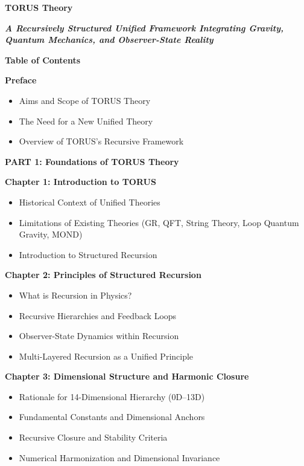 \documentclass[
]{article}
\author{}
\date{}
\begin{document}
\textbf{TORUS Theory\\
}

\emph{\textbf{A Recursively Structured Unified Framework Integrating
Gravity, Quantum Mechanics, and Observer-State Reality}}


\textbf{Table of Contents}

\textbf{Preface}

\begin{itemize}
\item
  Aims and Scope of TORUS Theory
\item
  The Need for a New Unified Theory
\item
  Overview of TORUS's Recursive Framework
\end{itemize}

\textbf{PART 1: Foundations of TORUS Theory}

\textbf{Chapter 1: Introduction to TORUS}

\begin{itemize}
\item
  Historical Context of Unified Theories
\item
  Limitations of Existing Theories (GR, QFT, String Theory, Loop Quantum
  Gravity, MOND)
\item
  Introduction to Structured Recursion
\end{itemize}

\textbf{Chapter 2: Principles of Structured Recursion}

\begin{itemize}
\item
  What is Recursion in Physics?
\item
  Recursive Hierarchies and Feedback Loops
\item
  Observer-State Dynamics within Recursion
\item
  Multi-Layered Recursion as a Unified Principle
\end{itemize}

\textbf{Chapter 3: Dimensional Structure and Harmonic Closure}

\begin{itemize}
\item
  Rationale for 14-Dimensional Hierarchy (0D--13D)
\item
  Fundamental Constants and Dimensional Anchors
\item
  Recursive Closure and Stability Criteria
\item
  Numerical Harmonization and Dimensional Invariance
\end{itemize}
\end{document}

